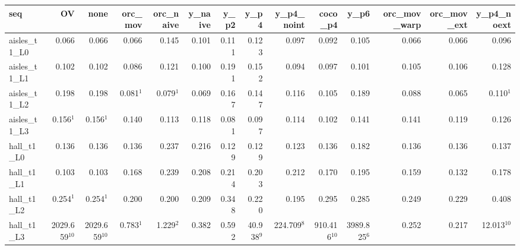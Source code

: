 \begin{tabular}{lrrrrrrrrrrrrr}
\toprule
seq & OV & none & orc\_mov & orc\_naive & y\_naive & y\_p2 & y\_p4 & y\_p4\_noint & coco\_p4 & y\_p6 & orc\_mov\_warp & orc\_mov\_ext & y\_p4\_noext \\
\midrule
aisles\_t1\_L0 & 0.066 & 0.066 & 0.066 & 0.145 & 0.101 & 0.111 & 0.123 & 0.097 & 0.092 & 0.105 & 0.066 & 0.066 & 0.096 \\
aisles\_t1\_L1 & 0.102 & 0.102 & 0.086 & 0.121 & 0.100 & 0.191 & 0.152 & 0.094 & 0.097 & 0.101 & 0.105 & 0.106 & 0.128 \\
aisles\_t1\_L2 & 0.198 & 0.198 & 0.081$^{1}$ & 0.079$^{1}$ & 0.069 & 0.167 & 0.147 & 0.116 & 0.105 & 0.189 & 0.088 & 0.065 & 0.110$^{1}$ \\
aisles\_t1\_L3 & 0.156$^{1}$ & 0.156$^{1}$ & 0.140 & 0.113 & 0.118 & 0.081 & 0.097 & 0.114 & 0.102 & 0.141 & 0.141 & 0.119 & 0.126 \\
hall\_t1\_L0 & 0.136 & 0.136 & 0.136 & 0.237 & 0.216 & 0.129 & 0.129 & 0.123 & 0.136 & 0.182 & 0.136 & 0.136 & 0.137 \\
hall\_t1\_L1 & 0.103 & 0.103 & 0.168 & 0.239 & 0.208 & 0.214 & 0.203 & 0.212 & 0.170 & 0.195 & 0.159 & 0.132 & 0.178 \\
hall\_t1\_L2 & 0.254$^{1}$ & 0.254$^{1}$ & 0.200 & 0.200 & 0.209 & 0.348 & 0.220 & 0.195 & 0.295 & 0.285 & 0.249 & 0.229 & 0.408 \\
hall\_t1\_L3 & 2029.659$^{10}$ & 2029.659$^{10}$ & 0.783$^{1}$ & 1.229$^{2}$ & 0.382 & 0.592 & 40.938$^{9}$ & 224.709$^{8}$ & 910.416$^{10}$ & 3989.825$^{6}$ & 0.252 & 0.217 & 12.013$^{10}$ \\
\bottomrule
\end{tabular}
